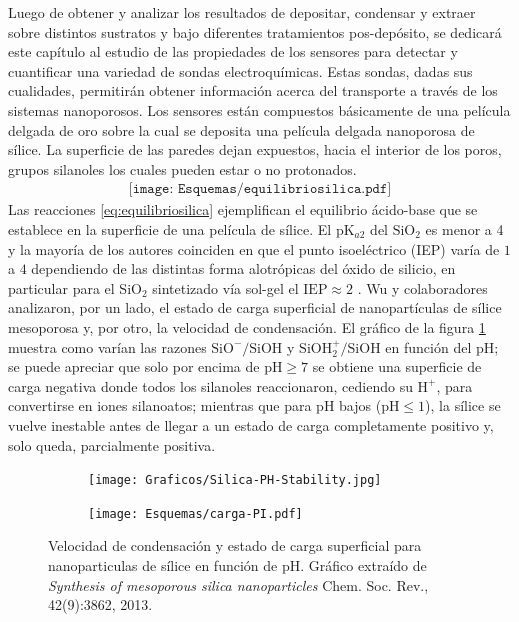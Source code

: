 	Luego de obtener y analizar los resultados de depositar, condensar y extraer \pdm\space sobre distintos sustratos y bajo diferentes tratamientos pos-depósito, se dedicará este capítulo al estudio de las propiedades de los sensores para detectar y cuantificar una variedad de sondas electroquímicas. Estas sondas, dadas sus cualidades, permitirán obtener información acerca del transporte a través de los sistemas nanoporosos. Los sensores están compuestos básicamente de una película delgada de oro sobre la cual se deposita  una película delgada nanoporosa de sílice. La superficie de las paredes dejan expuestos, hacia el interior de los poros, grupos silanoles los cuales pueden estar o no protonados.\cite{Brinker1990,Soler-Illia2011} 
			\begin{equation}
				\begin{aligned}
				\texttt{[image: Esquemas/equilibriosilica.pdf]}
				\label{eq:equilibriosilica}
				\end{aligned}
				\end{equation}
	Las reacciones \ref{eq:equilibriosilica} ejemplifican el equilibrio ácido-base que se establece en la superficie de una película de sílice. El pK$_{a2}$ del $\text{SiO}_2$ es menor a 4 y la mayoría de los autores coinciden en que el punto isoeléctrico (IEP) varía de $1$ a $4$ dependiendo de  las distintas forma alotrópicas del óxido de silicio, en particular para el SiO$_2$ sintetizado vía sol-gel el $\text{IEP}\approx 2$ \cite{Kosmulski2002,Kosmulski2014,Schwarz1984,Si-HanWu2013}.
	Wu y colaboradores\cite{Si-HanWu2013} analizaron, por un lado, el estado de carga superficial de nanopartículas de sílice mesoporosa y, por otro, la velocidad de condensación. El gráfico de la figura \ref{fig:silica_ph} muestra como varían las razones  $\text{SiO}^{-}/\text{SiOH}$ y $\text{SiOH}_2^{+}/\text{SiOH}$ en función del pH; se puede apreciar que solo por encima de $\text{pH}\geq7$ se obtiene una superficie de carga negativa donde todos los silanoles reaccionaron, cediendo su $\text{H}^{+}$, para convertirse en iones silanoatos; mientras que para pH bajos ($\text{pH}\leq1$), la sílice se vuelve inestable antes de llegar a un estado de carga completamente positivo y, solo queda, parcialmente positiva. 
		\begin{figure}[bh!]
			\begin{subfigure}[t]{0.73\textwidth}
 	       	\texttt{[image: Graficos/Silica-PH-Stability.jpg]}
 	       	\end{subfigure}
 	       	\begin{subfigure}[t]{0.25\textwidth}
 	       	 	\texttt{[image: Esquemas/carga-PI.pdf]}
	      	 \end{subfigure}
	    	\caption[Velocidad de condensación y estado de carga superficial]{Velocidad de condensación y estado de carga superficial para nanoparticulas de sílice en función de pH. Gráfico extraído de \textit{Synthesis of mesoporous silica nanoparticles} Chem. Soc. Rev., 42(9):3862, 2013.\cite{Si-HanWu2013}}
	       	\label{fig:silica_ph}
	    	\end{figure}

